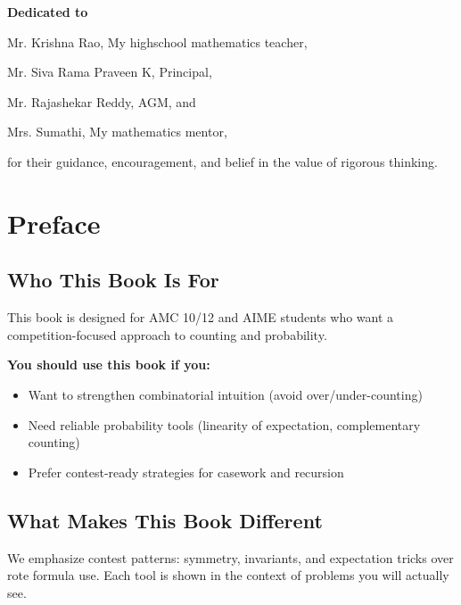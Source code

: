 \documentclass[12pt]{extarticle}
\begin{document}
\thispagestyle{empty}
\vspace*{\fill}
\begin{center}
\Large

\textbf{Dedicated to}

\vspace{1cm}

Mr. Krishna Rao, My highschool mathematics teacher,

Mr. Siva Rama Praveen K, Principal,

Mr. Rajashekar Reddy, AGM, and

Mrs. Sumathi, My mathematics mentor,

\vspace{1cm}

for their guidance, encouragement, and belief in the value of rigorous thinking.
\end{center}
\vspace*{\fill}

\newpage

	\tableofcontents
\newpage

\section*{Preface}

\subsection*{Who This Book Is For}
This book is designed for AMC 10/12 and AIME students who want a competition-focused approach to counting and probability.

\textbf{You should use this book if you:}
\begin{itemize}
    \item Want to strengthen combinatorial intuition (avoid over/under-counting)
    \item Need reliable probability tools (linearity of expectation, complementary counting)
    \item Prefer contest-ready strategies for casework and recursion
\end{itemize}

\subsection*{What Makes This Book Different}
We emphasize contest patterns: symmetry, invariants, and expectation tricks over rote formula use. Each tool is shown in the context of problems you will actually see.
\end{document}
